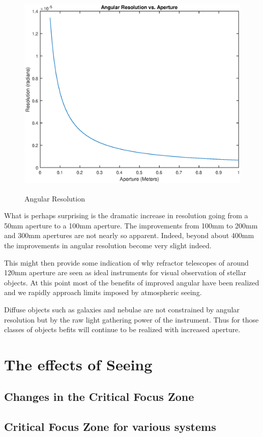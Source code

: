 \documentclass[11pt]{article}
\begin{document}
\begin{figure}[htb]
	\begin{center}
		\includegraphics[width=5.5in, height=4in ]{resolution.eps}
		\caption{Angular Resolution}
		\label{fig:resolution}
	\end{center}
\end{figure}

What is perhaps surprising is the dramatic increase in resolution going from a 50mm aperture to a 100mm aperture. The improvements from 100mm to 200mm and 300mm apertures are not nearly so apparent.  Indeed, beyond about 400mm the improvements in angular resolution become very slight indeed.

This might then provide some indication of why refractor telescopes of around 120mm aperture are seen as ideal instruments for visual observation of stellar objects.  At this point most of the benefits of improved angular have been realized and we rapidly approach limits imposed by atmospheric seeing.

Diffuse objects such as galaxies and nebulae are not constrained by angular resolution but by the raw light gathering power of the instrument.  Thus for those classes of objects befits will continue to be realized with increased aperture.   





\section{The effects of Seeing}

\subsection{Changes in the Critical Focus Zone}

\subsection{Critical Focus Zone for various systems}
\end{document}
